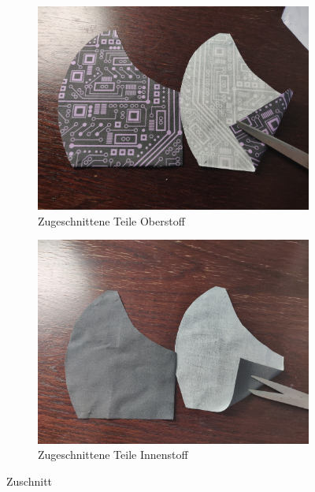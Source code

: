 \documentclass[12pt,parskip=full]{scrartcl}
\begin{document}
\begin{figure}[ht]
    \begin{subfigure}{0.48\textwidth}
        \centering
        \includegraphics[width = \linewidth]{Pictures/03_Cutting/Cutting_03_resized.jpg}
        \caption{Zugeschnittene Teile Oberstoff}
        \label{Cutting3}
    \end{subfigure}
    \begin{subfigure}{0.48\textwidth}
        \centering
        \includegraphics[width = \linewidth]{Pictures/03_Cutting/Cutting_04_resized.jpg}
        \caption{Zugeschnittene Teile Innenstoff}
        \label{Cutting4}
    \end{subfigure}
    \caption{Zuschnitt}
    \label{Cutting}
\end{figure}
\end{document}
